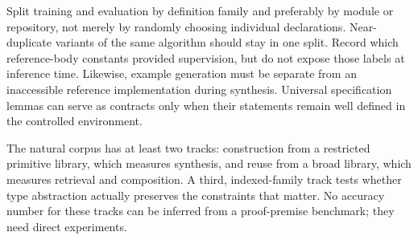 Split training and evaluation by definition family and preferably by module or repository, not merely by randomly choosing individual declarations. Near-duplicate variants of the same algorithm should stay in one split. Record which reference-body constants provided supervision, but do not expose those labels at inference time. Likewise, example generation must be separate from an inaccessible reference implementation during synthesis. Universal specification lemmas can serve as contracts only when their statements remain well defined in the controlled environment.

The natural corpus has at least two tracks: construction from a restricted primitive library, which measures synthesis, and reuse from a broad library, which measures retrieval and composition. A third, indexed-family track tests whether type abstraction actually preserves the constraints that matter. No accuracy number for these tracks can be inferred from a proof-premise benchmark; they need direct experiments.

